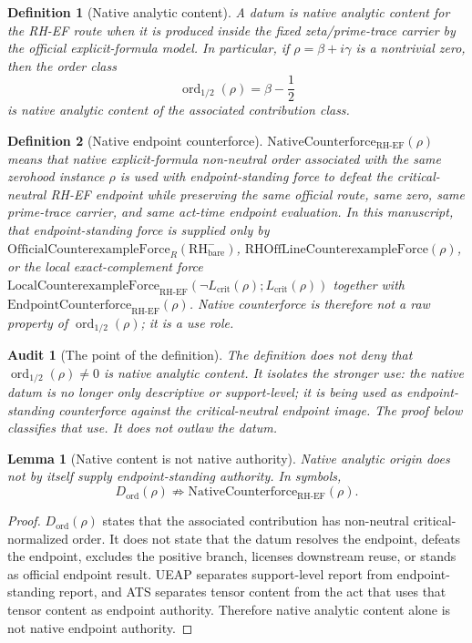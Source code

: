 \documentclass[11pt]{article}
\newtheorem{definition}{Definition}[section]
\newtheorem{lemma}{Lemma}[section]
\newtheorem{audit}{Audit}[section]
\newcommand{\Lcrit}{L_{\mathrm{crit}}}
\newcommand{\RH}{\mathrm{RH}}
\newcommand{\EF}{\mathrm{EF}}
\newcommand{\OfficialCxForce}{\mathrm{OfficialCounterexampleForce}}
\newcommand{\LocalCxForce}{\mathrm{LocalCounterexampleForce}}
\newcommand{\RHOffCxForce}{\mathrm{RHOffLineCounterexampleForce}}
\newcommand{\Counterforce}{\mathrm{EndpointCounterforce}}
\newcommand{\ordhalf}{\operatorname{ord}_{1/2}}
\newcommand{\Dord}{D_{\mathrm{ord}}}
\newcommand{\NativeCounterforce}{\mathrm{NativeCounterforce}}
\begin{document}
\begin{definition}[Native analytic content]
A datum is native analytic content for the RH-EF route when it is produced inside the fixed zeta/prime-trace carrier by the official explicit-formula model.  In particular, if \(\rho=\beta+i\gamma\) is a nontrivial zero, then the order class
\[
\ordhalf(\rho)=\beta-\frac12
\]
is native analytic content of the associated contribution class.
\end{definition}

\begin{definition}[Native endpoint counterforce]
\(\NativeCounterforce_{\RH\text{-}\EF}(\rho)\) means that native explicit-formula non-neutral order associated with the same zerohood instance \(\rho\) is used with endpoint-standing force to defeat the critical-neutral RH-EF endpoint while preserving the same official route, same zero, same prime-trace carrier, and same act-time endpoint evaluation.  In this manuscript, that endpoint-standing force is supplied only by \(\OfficialCxForce_R(\RH^-_{\mathrm{bare}})\), \(\RHOffCxForce(\rho)\), or the local exact-complement force \(\LocalCxForce_{\RH\text{-}\EF}(\neg\Lcrit(\rho);\Lcrit(\rho))\) together with \(\Counterforce_{\RH\text{-}\EF}(\rho)\).  Native counterforce is therefore not a raw property of \(\ordhalf(\rho)\); it is a use role.
\end{definition}

\begin{audit}[The point of the definition]
The definition does not deny that \(\ordhalf(\rho)\ne0\) is native analytic content.  It isolates the stronger use: the native datum is no longer only descriptive or support-level; it is being used as endpoint-standing counterforce against the critical-neutral endpoint image.  The proof below classifies that use.  It does not outlaw the datum.
\end{audit}

\begin{lemma}[Native content is not native authority]
Native analytic origin does not by itself supply endpoint-standing authority.  In symbols,
\[
\Dord(\rho)\not\Rightarrow \NativeCounterforce_{\RH\text{-}\EF}(\rho).
\]
\end{lemma}

\begin{proof}
\(\Dord(\rho)\) states that the associated contribution has non-neutral critical-normalized order.  It does not state that the datum resolves the endpoint, defeats the endpoint, excludes the positive branch, licenses downstream reuse, or stands as official endpoint result.  UEAP separates support-level report from endpoint-standing report, and ATS separates tensor content from the act that uses that tensor content as endpoint authority.  Therefore native analytic content alone is not native endpoint authority.
\end{proof}
\end{document}
